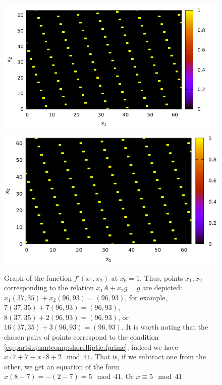 \begin{figure}
\centering

\ifpdf
\includegraphics[angle=0]
{./part4/quantcomp/picellipticdiscretlog1.pdf}
\else
\includegraphics[angle=0]
{./part4/quantcomp/picellipticdiscretlog1.eps}
\fi

%




\caption{Graph of the function 
$f'(x_1, x_2)$ at $x_0 = 1$. Thus, points $x_1, x_2$
  corresponding to the relation $x_1 A + x_2 g = g$ are depicted: 
  $x_1 (37, 35) + x_2 (96,93) = (96,93)$, for example,
  $7 (37, 35) + 7 (96,93) = (96,93)$, $8 (37, 35) + 2 (96,93) =
  (96,93)$, or $16 (37, 35) + 3 (96,93) =
  (96,93)$. It is worth noting that the chosen pairs of points correspond
  to the condition \eqref{eq:part4:quantcomp:shorelliptic:fprime}, indeed
  we have $x \cdot 7 + 7 \equiv x \cdot 8 + 2 \mod 41$. 
  That is, if we subtract one from the other,
  we get an equation of the form $x \left(8-7\right) = - (2 - 7) = 5 \mod 41$.
  Or $x \equiv 5 \mod 41$} 
\label{fig:part4:quantcomp:dle1}
\end{figure}